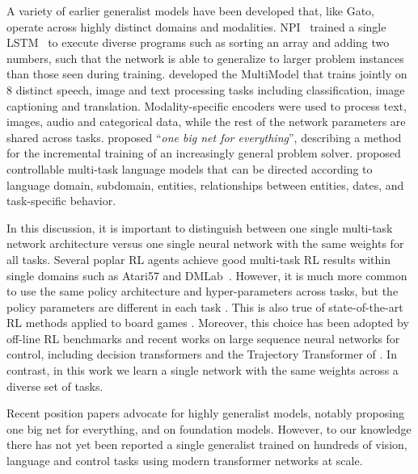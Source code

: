 \documentclass[10pt]{article} \usepackage[accepted]{tmlr}
\newcommand{\model}{{Gato}}
\begin{document}
A variety of earlier generalist models have been developed that, like \model{}, operate across highly distinct domains and modalities.
NPI~\citep{reed2016neural} trained a single LSTM~\citep{hochreiter1997long} to execute diverse programs such as sorting an array and adding two numbers, such that the network is able to generalize to larger problem instances than those seen during training.
\citet{kaiser2017one} developed the MultiModel that trains jointly on 8 distinct speech, image and text processing tasks including classification, image captioning and translation.
Modality-specific encoders were used to process text, images, audio and categorical data, while the rest of the network parameters are shared across tasks.
\citet{schmidhuber2018one} proposed ``\emph{one big net for everything}'', describing a method for the incremental training of an increasingly general problem solver.
\citet{keskar2019ctrl} proposed controllable multi-task language models that can be directed according to language domain, subdomain, entities, relationships
between entities, dates, and task-specific behavior.

In this discussion, it is important to distinguish between one single multi-task network architecture versus one single neural network with the same weights for all tasks.
Several poplar RL agents achieve good multi-task RL results within single domains such as Atari57 and DMLab~\citep{espeholt2018impala,song2019v,hessel2019multi}.
However, it is much more common to use the same policy architecture and hyper-parameters across tasks, but the policy parameters are different in each task \citep{mnih2015human,tassa2018deepmind}. 
This is also true of state-of-the-art RL methods applied to board games \citep{schrittwieser2020mastering}. Moreover, this choice has been adopted by off-line RL benchmarks \citep{gulcehre2020rl,fu2020d4rl} and recent works on large sequence neural networks for control, including decision transformers \citep{chen2021decision,reid2022can,zheng2022online} and the Trajectory Transformer of \cite{janner2021offline}. In contrast, in this work we learn a single network with the same weights across a diverse set of tasks. 

Recent position papers advocate for highly generalist models, notably \cite{schmidhuber2018one} proposing one big net for everything, and \cite{bommasani2021opportunities} on foundation models.
However, to our knowledge there has not yet been reported a single generalist trained on hundreds of vision, language and control tasks using modern transformer networks at scale.
\end{document}

